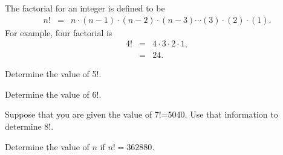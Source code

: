 \begin{problem}
\item The factorial for an integer is defined to be 
  \begin{eqnarray*}
    n! & = & n \cdot (n-1) \cdot (n-2) \cdot (n-3) \cdots (3) \cdot (2) \cdot (1).
  \end{eqnarray*}
  For example, four factorial is 
  \begin{eqnarray*}
    4! & = & 4 \cdot 3 \cdot 2 \cdot 1, \\
       & = & 24.
  \end{eqnarray*}

  \begin{subproblem}
  \item Determine the value of 5!.
    \vfill
  \item Determine the value of 6!.
    \vfill
  \item Suppose that you are given the value of 7!=5040. Use that
    information to determine 8!.
    \vfill
  \item Determine the value of $n$ if $n!=362880$.
    \vfill
  \end{subproblem}
\end{problem}


